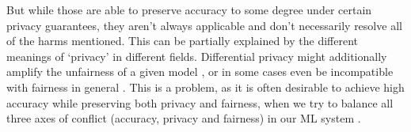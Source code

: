 	But while those are able to preserve accuracy to some degree under certain privacy guarantees, they aren't always applicable and don't necessarily resolve all of the harms mentioned.
	This can be partially explained by the different meanings of `privacy' in different fields.
	Differential privacy might additionally amplify the unfairness of a given model \cite{bagdasaryan2019differential}, or in some cases even be incompatible with fairness in general \cite{cummings2019compatibility}. 
	This is a problem, as it is often desirable to achieve high accuracy while preserving both privacy and fairness, \eg when we try to balance all three axes of conflict (accuracy, privacy and fairness) in our ML system \cite{Chester2020}.
